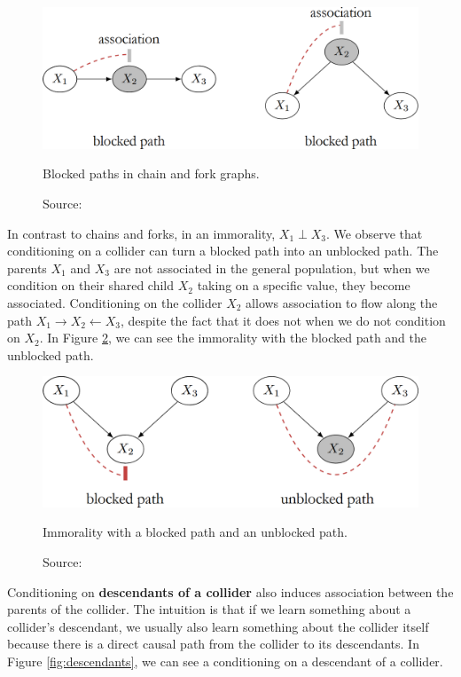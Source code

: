 \begin{figure}[h]
    \centering
    \includegraphics[width=.65\linewidth]{figures/ch3/18.blocked.png}
    \caption{Blocked paths in chain and fork graphs.}
    \vspace{-10px}
    \caption*{\scriptsize{Source: \cite{Neal_2020a}}}
    \label{fig:blocked_paths}
\end{figure}

In contrast to chains and forks, in an immorality, \(X_1 \perp X_3\).
We observe that conditioning on a collider can turn a blocked path
into an unblocked path. The parents \(X_1\) and \(X_3\)
are not associated in the general population, but when we condition
on their shared child \(X_2\) taking on a specific value,
they become associated. Conditioning on the collider \(X_2\)
allows association to flow along the path
\(X_1 \rightarrow X_2 \leftarrow X_3\), despite the fact that it
does not when we do not condition on \(X_2\).
In Figure \ref{fig:immorality}, we can see the immorality with
the blocked path and the unblocked path.

\begin{figure}[h]
    \centering
    \includegraphics[width=.65\linewidth]{figures/ch3/19.immorality.png}
    \caption{Immorality with a blocked path and an unblocked path.}
    \vspace{-10px}
    \caption*{\scriptsize{Source: \cite{Neal_2020a}}}
    \label{fig:immorality}
\end{figure}

Conditioning on \textbf{descendants of a collider} also induces
association between the parents of the collider.
The intuition is that if we learn something about a collider's descendant,
we usually also learn something about the collider itself because there
is a direct causal path from the collider to its descendants.
In Figure \ref{fig:descendants}, we can see a conditioning
on a descendant of a collider.

